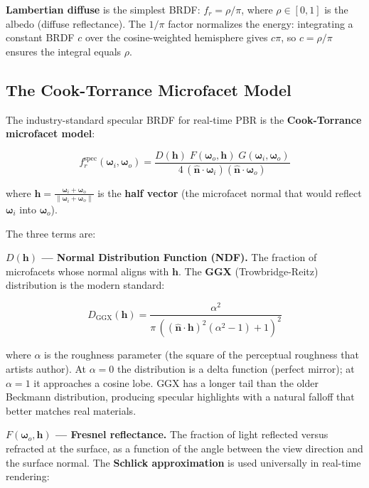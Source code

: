 \documentclass[
  11pt,
  letterpaper,
  DIV=11,
  numbers=noendperiod,
  twoside,
  open=right]{scrreprt}
\begin{document}
\textbf{Lambertian diffuse} is the simplest BRDF: \(f_r = \rho / \pi\),
where \(\rho \in [0, 1]\) is the albedo (diffuse reflectance). The
\(1/\pi\) factor normalizes the energy: integrating a constant BRDF
\(c\) over the cosine-weighted hemisphere gives \(c\pi\), so
\(c = \rho / \pi\) ensures the integral equals \(\rho\).

\subsection{The Cook-Torrance Microfacet
Model}\label{the-cook-torrance-microfacet-model}

The industry-standard specular BRDF for real-time PBR is the
\textbf{Cook-Torrance microfacet model}:

\[
f_r^{\text{spec}}(\boldsymbol{\omega}_i, \boldsymbol{\omega}_o) = \frac{D(\mathbf{h}) \; F(\boldsymbol{\omega}_o, \mathbf{h}) \; G(\boldsymbol{\omega}_i, \boldsymbol{\omega}_o)}{4 \, (\hat{\mathbf{n}} \cdot \boldsymbol{\omega}_i)(\hat{\mathbf{n}} \cdot \boldsymbol{\omega}_o)}
\]

where
\(\mathbf{h} = \frac{\boldsymbol{\omega}_i + \boldsymbol{\omega}_o}{\|\boldsymbol{\omega}_i + \boldsymbol{\omega}_o\|}\)
is the \textbf{half vector} (the microfacet normal that would reflect
\(\boldsymbol{\omega}_i\) into \(\boldsymbol{\omega}_o\)).

The three terms are:

\textbf{\(D(\mathbf{h})\) --- Normal Distribution Function (NDF).} The
fraction of microfacets whose normal aligns with \(\mathbf{h}\). The
\textbf{GGX} (Trowbridge-Reitz) distribution is the modern standard:

\[
D_{\text{GGX}}(\mathbf{h}) = \frac{\alpha^2}{\pi \, ((\hat{\mathbf{n}} \cdot \mathbf{h})^2 (\alpha^2 - 1) + 1)^2}
\]

where \(\alpha\) is the roughness parameter (the square of the
perceptual roughness that artists author). At \(\alpha = 0\) the
distribution is a delta function (perfect mirror); at \(\alpha = 1\) it
approaches a cosine lobe. GGX has a longer tail than the older Beckmann
distribution, producing specular highlights with a natural falloff that
better matches real materials.

\textbf{\(F(\boldsymbol{\omega}_o, \mathbf{h})\) --- Fresnel
reflectance.} The fraction of light reflected versus refracted at the
surface, as a function of the angle between the view direction and the
surface normal. The \textbf{Schlick approximation} is used universally
in real-time rendering:
\end{document}
